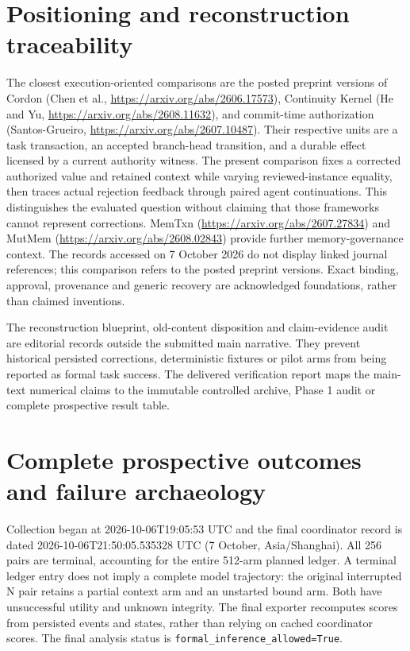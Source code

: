 \documentclass[11pt,a4paper]{article}
\newcommand{\code}[1]{\nolinkurl{#1}}
\begin{document}
\section{Positioning and reconstruction traceability}
The closest execution-oriented comparisons are the posted preprint versions of Cordon (Chen et al., \url{https://arxiv.org/abs/2606.17573}), Continuity Kernel (He and Yu, \url{https://arxiv.org/abs/2608.11632}), and commit-time authorization (Santos-Grueiro, \url{https://arxiv.org/abs/2607.10487}). Their respective units are a task transaction, an accepted branch-head transition, and a durable effect licensed by a current authority witness. The present comparison fixes a corrected authorized value and retained context while varying reviewed-instance equality, then traces actual rejection feedback through paired agent continuations. This distinguishes the evaluated question without claiming that those frameworks cannot represent corrections. MemTxn (\url{https://arxiv.org/abs/2607.27834}) and MutMem (\url{https://arxiv.org/abs/2608.02843}) provide further memory-governance context. The records accessed on 7 October 2026 do not display linked journal references; this comparison refers to the posted preprint versions. Exact binding, approval, provenance and generic recovery are acknowledged foundations, rather than claimed inventions.

The reconstruction blueprint, old-content disposition and claim-evidence audit are editorial records outside the submitted main narrative. They prevent historical persisted corrections, deterministic fixtures or pilot arms from being reported as formal task success. The delivered verification report maps the main-text numerical claims to the immutable controlled archive, Phase 1 audit or complete prospective result table.

\section{Complete prospective outcomes and failure archaeology}
\label{app:phase2-results}
Collection began at 2026-10-06T19:05:53 UTC and the final coordinator record is dated 2026-10-06T21:50:05.535328 UTC (7 October, Asia/Shanghai). All 256 pairs are terminal, accounting for the entire 512-arm planned ledger. A terminal ledger entry does not imply a complete model trajectory: the original interrupted N pair retains a partial context arm and an unstarted bound arm. Both have unsuccessful utility and unknown integrity. The final exporter recomputes scores from persisted events and states, rather than relying on cached coordinator scores. The final analysis status is \code{formal_inference_allowed=True}.
\end{document}
